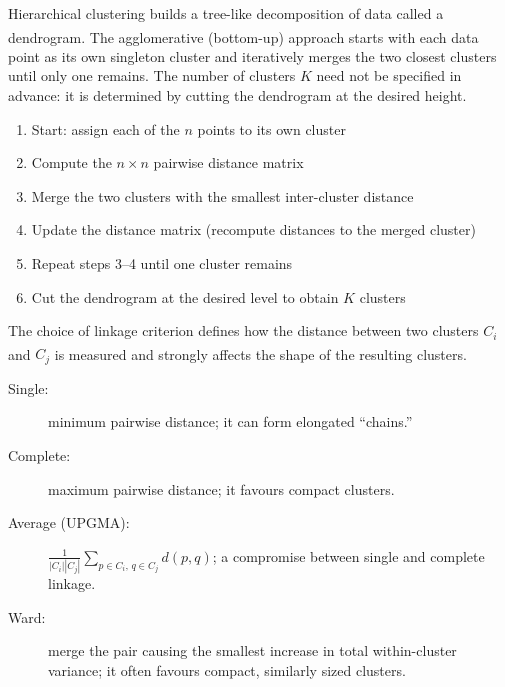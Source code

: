 \begin{tcbitemize}[ skin=sectionraster, halign lower=center ]
    \tcbitem[title=Agglomerative Hierarchical Clustering, raster multicolumn=3]
    Hierarchical clustering builds a tree-like decomposition of data called a dendrogram\textsuperscript{\cite[][p.457]{hanDataMiningConcepts2012}}. The agglomerative (bottom-up) approach starts with each data point as its own singleton cluster and iteratively merges the two closest clusters until only one remains. The number of clusters $K$ need not be specified in advance: it is determined by cutting the dendrogram at the desired height.
    \tcblower
    \begin{enumerate}
        \item Start: assign each of the $n$ points to its own cluster
        \item Compute the $n \times n$ pairwise distance matrix
        \item Merge the two clusters with the smallest inter-cluster distance
        \item Update the distance matrix (recompute distances to the merged cluster)
        \item Repeat steps 3--4 until one cluster remains
        \item Cut the dendrogram at the desired level to obtain $K$ clusters
    \end{enumerate}

    \tcbitem[title=Linkage Criteria, raster multicolumn=3]
    The choice of linkage criterion defines how the distance between two clusters $C_i$ and $C_j$ is measured and strongly affects the shape of the resulting clusters\textsuperscript{\cite[][pp.~460--463]{hanDataMiningConcepts2012}}.
    \tcblower
    \begin{description}
        \item[Single:] minimum pairwise distance; it can form elongated
        ``chains.''
        \item[Complete:] maximum pairwise distance; it favours compact
        clusters.
        \item[Average (UPGMA):]
        $\frac{1}{|C_i||C_j|}\sum_{p\in C_i,\,q\in C_j}d(p,q)$; a compromise
        between single and complete linkage.
        \item[Ward:] merge the pair causing the smallest increase in total
        within-cluster variance; it often favours compact, similarly sized
        clusters.
    \end{description}


\end{tcbitemize}
